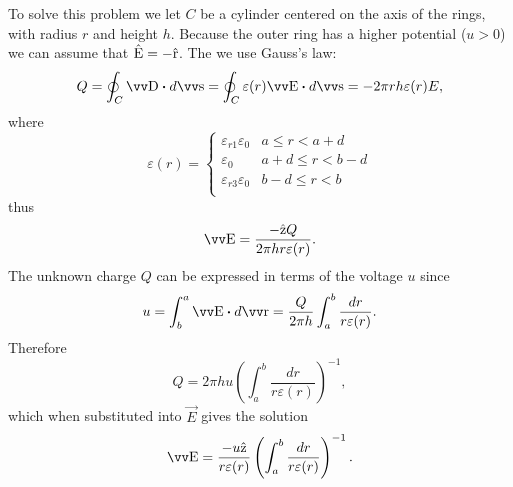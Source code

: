 \documentclass[margin=small]{tex/hsrzf}
\theoremstyle{elmagzf}
\begin{document}
To solve this problem we let \(C\) be a cylinder centered on the axis of the
rings, with radius \(r\) and height \(h\). Because the outer ring has a higher
potential (\(u > 0\)) we can assume that \(\hat{\mathrm{E}} = -\hat{\mathrm{r}}\). The we use
Gauss's law:
\[
  Q = \oint_C \vec{D} \dotp d\vec{s} 
    = \oint_C \varepsilon(r) \vec{E} \dotp d\vec{s}
    = - 2 \pi r h \varepsilon(r) E,
\]
where
\[
  \varepsilon(r) = \begin{cases}
    \varepsilon_{r1}\varepsilon_0  & a \leq r < a + d     \\
    \varepsilon_0                  & a + d \leq r < b - d \\
    \varepsilon_{r3}\varepsilon_0  & b - d \leq r < b     \\
  \end{cases}
\]
thus
\[
  \vec{E} = \frac{-\uvec{z} Q}{2 \pi h r\varepsilon(r)}.
\]
The unknown charge \(Q\) can be expressed in terms of the voltage \(u\) since
\[
  u = \int_b^a \vec{E} \dotp d\vec{r}
   = \frac{Q}{2\pi h} \int_a^b \frac{dr}{r\varepsilon(r)}.
\]
Therefore
\[
  Q = 2\pi h u \left( \int_a^b \frac{dr}{r\varepsilon(r)} \right)^{-1},
\]
which when substituted into \(\vec{E}\) gives the solution
\[
  \vec{E} = \frac{-u \uvec{z}}{r\varepsilon(r)} \left(
    \int_a^b \frac{dr}{r\varepsilon(r)}
  \right)^{-1}.
\]
\end{document}
